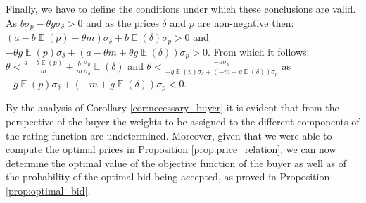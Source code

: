 \documentclass[informs]{informs3}
\begin{document}
Finally, we have to define the conditions under which these conclusions are valid. As  $b\sigma_{p}-\theta g\sigma_{\delta} > 0$ and as the prices $\delta$  and $p$ are non-negative then: 
$\left(a-b\mathop{\mathbb{E}}\left(p\right) -\theta m\right)\sigma_{\delta}+b\mathop{\mathbb{E}}\left(\delta\right)\sigma_{p}>0$ and
$-\theta g \mathop{\mathbb{E}}\left(p\right)\sigma_{\delta}+\left(a-\theta m+\theta g \mathop{\mathbb{E}}\left(\delta\right)\right)\sigma_{p}>0$.
From which it follows: 
$ \theta < \frac{a-b\mathop{\mathbb{E}}\left(p\right)}{m}   +\frac{b}{m} \frac{\sigma_{p}}{\sigma_{\delta}} \mathop{\mathbb{E}}\left(\delta\right)$ and
$\theta<\frac{-a\sigma_{p}}{- g \mathop{\mathbb{E}}\left(p\right)\sigma_{\delta}+\left(-m+g \mathop{\mathbb{E}}\left(\delta\right)\right)\sigma_{p}}$ as $- g \mathop{\mathbb{E}}\left(p\right)\sigma_{\delta}+\left(-m+g \mathop{\mathbb{E}}\left(\delta\right)\right)\sigma_{p}<0$.\Halmos
\endproof 

By the analysis of Corollary \ref{cor:necessary_buyer} it is evident that from the perspective of the buyer the weights to be assigned to the different components of the rating function are undetermined. 
Moreover, given that we were able to compute the optimal prices in Proposition  \ref{prop:price_relation}, we can now determine the optimal value of the objective function of the buyer as well as of the probability of the optimal bid being accepted, as proved in Proposition \ref{prop:optimal_bid}.
\end{document}
